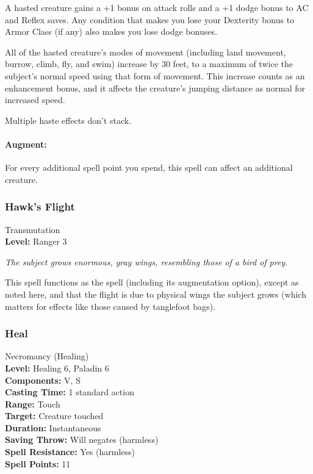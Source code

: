 A hasted creature gains a +1 bonus on attack rolls and a +1 dodge bonus to AC and Reflex saves. 
Any condition that makes you lose your Dexterity bonus to Armor Class (if any) also makes you lose dodge bonuses.

All of the hasted creature's modes of movement (including land movement, burrow, climb, fly, and swim) 
increase by 30 feet, to a maximum of twice the subject's normal speed using that form of movement. 
This increase counts as an enhancement bonus, and it affects the creature's jumping distance as normal for increased speed.

Multiple haste effects don't stack.

\paragraph{Augment:} For every additional spell point you spend, this spell can affect an additional creature.
\subsubsection{Hawk's Flight}
\label{Spell:HawksFlight}
Transmutation
\\ \textbf{Level:} Ranger 3

\emph{The subject grows enormous, gray wings, resembling those of a bird of prey.}

This spell functions as the  spell (including its augmentation option), except as noted here, and that the flight is due to physical wings the subject grows (which matters for effects like those caused by tanglefoot bags).
\subsubsection{Heal}
\label{Spell:Heal}
Necromancy (Healing)
\\ \textbf{Level:} Healing 6, Paladin 6
\\ \textbf{Components:} V, S
\\ \textbf{Casting Time:} 1 standard action
\\ \textbf{Range:} Touch
\\ \textbf{Target:} Creature touched
\\ \textbf{Duration:} Instantaneous
\\ \textbf{Saving Throw:} Will negates (harmless)
\\ \textbf{Spell Resistance:} Yes (harmless)
\\ \textbf{Spell Points:} 11


